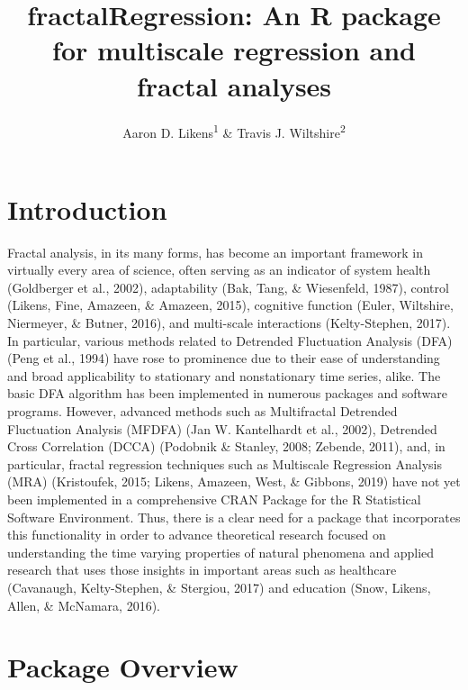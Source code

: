 \documentclass[
  english,
  man]{apa6}
\title{fractalRegression: An R package for multiscale regression and fractal analyses}
\author{Aaron D. Likens\textsuperscript{1} \& Travis J. Wiltshire\textsuperscript{2}}
\date{}
\affiliation{\vspace{0.5cm}\textsuperscript{1} Department of Biomechanics, University of Nebraska at Omaha\\\textsuperscript{2} Department of Cognitive Science \& Artificial Intelligence, Tilburg University}
\begin{document}
\maketitle

\hypertarget{introduction}{%
\section{Introduction}\label{introduction}}

Fractal analysis, in its many forms, has become an important framework
in virtually every area of science, often serving as an indicator of
system health (Goldberger et al., 2002), adaptability
(Bak, Tang, \& Wiesenfeld, 1987), control
(Likens, Fine, Amazeen, \& Amazeen, 2015), cognitive function
(Euler, Wiltshire, Niermeyer, \& Butner, 2016), and multi-scale interactions
(Kelty-Stephen, 2017). In particular, various
methods related to Detrended Fluctuation Analysis (DFA)
(Peng et al., 1994) have rose to prominence due to their
ease of understanding and broad applicability to stationary and
nonstationary time series, alike. The basic DFA algorithm has been
implemented in numerous packages and software programs. However,
advanced methods such as Multifractal Detrended Fluctuation Analysis
(MFDFA) (Jan W. Kantelhardt et al., 2002), Detrended
Cross Correlation (DCCA) (Podobnik \& Stanley, 2008; Zebende, 2011), and, in particular,
fractal regression techniques such as Multiscale Regression Analysis
(MRA) (Kristoufek, 2015; Likens, Amazeen, West, \& Gibbons, 2019) have not yet been
implemented in a comprehensive CRAN Package for the R Statistical
Software Environment. Thus, there is a clear need for a package that
incorporates this functionality in order to advance theoretical research
focused on understanding the time varying properties of natural
phenomena and applied research that uses those insights in important
areas such as healthcare (Cavanaugh, Kelty-Stephen, \& Stergiou, 2017) and education (Snow, Likens, Allen, \& McNamara, 2016).

\hypertarget{package-overview}{%
\section{Package Overview}\label{package-overview}}
\end{document}
